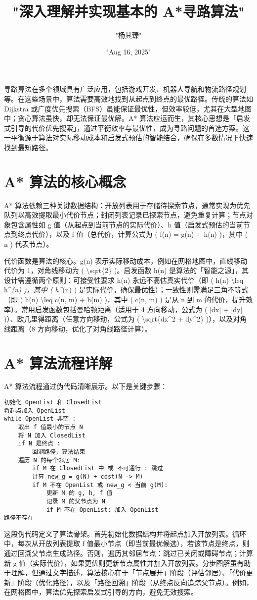 \title{"深入理解并实现基本的 A*寻路算法"}
\author{"杨其臻"}
\date{"Aug 16, 2025"}
\maketitle
寻路算法在多个领域具有广泛应用，包括游戏开发、机器人导航和物流路径规划等。在这些场景中，算法需要高效地找到从起点到终点的最优路径。传统的算法如 Dijkstra 或广度优先搜索（BFS）虽能保证最优性，但效率较低，尤其在大型地图中；贪心算法虽快，却无法保证最优解。A* 算法应运而生，其核心思想是「启发式引导的代价优先搜索」，通过平衡效率与最优性，成为寻路问题的首选方案。这一平衡源于算法对实际移动成本和启发式预估的智能结合，确保在多数情况下快速找到最短路径。\par
\chapter{A* 算法的核心概念}
A* 算法依赖三种关键数据结构：开放列表用于存储待探索节点，通常实现为优先队列以高效提取最小代价节点；封闭列表记录已探索节点，避免重复计算；节点对象包含属性如 g 值（从起点到当前节点的实际代价）、h 值（启发式预估的当前节点到终点代价），以及 f 值（总代价，计算公式为 ( f(n) = g(n) + h(n) )，其中 ( n ) 代表节点）。\par
代价函数是算法的核心。g(n) 表示实际移动成本，例如在网格地图中，直线移动代价为 1，对角线移动为 ( \textbackslash{}sqrt\{{}2\}{} )。启发函数 h(n) 是算法的「智能之源」，其设计需遵循两个原则：可接受性要求 h(n) 永远不高估真实代价（即 ( h(n) \textbackslash{}leq h\^{}\textit{(n) )，其中 ( h\^{}}(n) ) 是实际代价，确保最优性）；一致性则需满足三角不等式（即 ( h(n) \textbackslash{}leq c(n, m) + h(m) )，其中 ( c(n, m) ) 是从 n 到 m 的代价，提升效率）。常用启发函数包括曼哈顿距离（适用于 4 方向移动，公式为 ( |dx| + |dy| )）、欧几里得距离（任意方向移动，公式为 ( \textbackslash{}sqrt\{{}dx\^{}2 + dy\^{}2\}{} )），以及对角线距离（8 方向移动，优化了对角线路径计算）。\par
\chapter{A* 算法流程详解}
A* 算法流程通过伪代码清晰展示。以下是关键步骤：\par
\begin{lstlisting}[language=plaintext]
初始化 OpenList 和 ClosedList
将起点加入 OpenList
while OpenList 非空 :
    取出 f 值最小的节点 N
    将 N 加入 ClosedList
    if N 是终点 : 
        回溯路径，算法结束
    遍历 N 的每个邻居 M:
        if M 在 ClosedList 中 或 不可通行 : 跳过
        计算 new_g = g(N) + cost(N -> M)
        if M 不在 OpenList 或 new_g < 当前 g(M):
            更新 M 的 g, h, f 值
            记录 M 的父节点为 N
            if M 不在 OpenList: 加入 OpenList
路径不存在
\end{lstlisting}
这段伪代码定义了算法骨架。首先初始化数据结构并将起点加入开放列表。循环中，每次从开放列表提取 f 值最小节点（即当前最优候选），若该节点是终点，则通过回溯父节点生成路径。否则，遍历其邻居节点：跳过已关闭或障碍节点；计算新 g 值（实际代价），如果更优则更新节点属性并加入开放列表。分步图解虽有助于理解，但通过文字描述，算法核心在于「节点展开」阶段（评估邻居）、「代价更新」阶段（优化路径），以及「路径回溯」阶段（从终点反向追踪父节点）。例如，在网格图中，算法优先探索启发式引导的方向，避免无效搜索。\par
